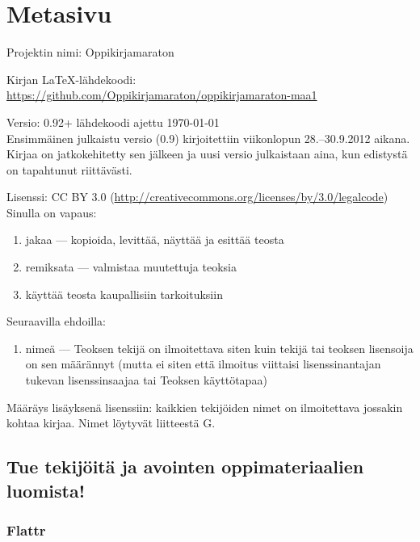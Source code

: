 \newpage

\section*{Metasivu}

Projektin nimi: Oppikirjamaraton

Kirjan LaTeX-lähdekoodi: \\
\url{https://github.com/Oppikirjamaraton/oppikirjamaraton-maa1}

Versio: 0.92+ \qquad lähdekoodi ajettu \today \\
Ensimmäinen julkaistu versio (0.9) kirjoitettiin viikonlopun 28.--30.9.2012 aikana. Kirjaa on jatkokehitetty sen jälkeen ja uusi versio julkaistaan aina, kun edistystä on tapahtunut riittävästi.

Lisenssi: CC BY 3.0 (\url{http://creativecommons.org/licenses/by/3.0/legalcode})\\
Sinulla on vapaus:
\begin{enumerate}
\item jakaa — kopioida, levittää, näyttää ja esittää teosta
\item remiksata — valmistaa muutettuja teoksia
\item käyttää teosta kaupallisiin tarkoituksiin
\end{enumerate}
Seuraavilla ehdoilla:
\begin{enumerate}
\item nimeä — Teoksen tekijä on ilmoitettava siten kuin tekijä tai teoksen lisensoija on sen määrännyt (mutta ei siten että ilmoitus viittaisi lisenssinantajan tukevan lisenssinsaajaa tai Teoksen käyttötapaa)
\end{enumerate}

Määräys lisäyksenä lisenssiin: kaikkien tekijöiden nimet on ilmoitettava jossakin kohtaa kirjaa. Nimet löytyvät liitteestä G.

\subsection*{Tue tekijöitä ja avointen oppimateriaalien luomista!}

\subsubsection*{Flattr}


